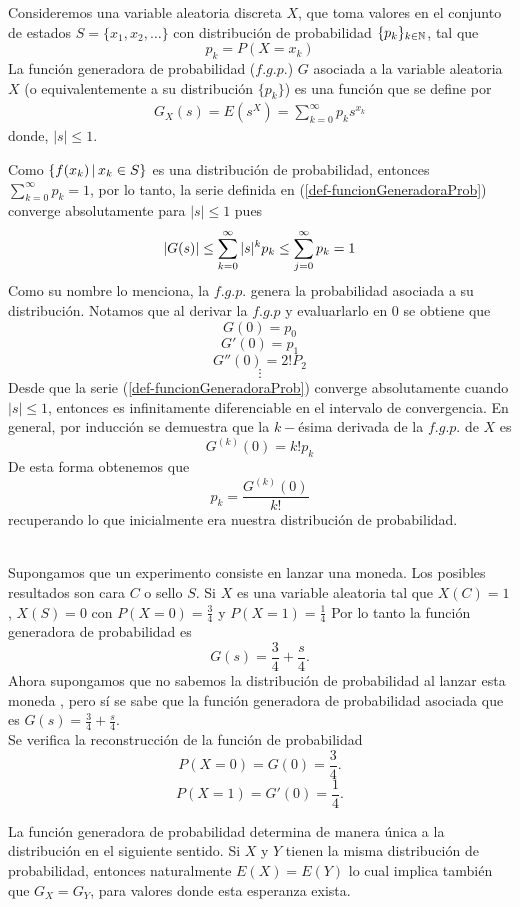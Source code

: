 \begin{Def}
    \label{def-prob-funcionGeneraProb}
    Consideremos una variable aleatoria discreta $X$, que toma valores en el conjunto de estados $S=\{x_1,x_2,\ldots\}$ con distribución de probabilidad $\{p_k\}_{k\in{\mathbb{N}}}$, tal que $$p_k=P(X=x_k)$$ 
    La función generadora de probabilidad ($f.g.p.$) $G$ asociada a la variable aleatoria $X$ (o equivalentemente a su distribución $\{p_k\}$) es una función que se define por 
    \begin{eqnarray}
        G_X(s)=E(s^X)=\sum_{k=0}^\infty p_k s^{x_k} \label{def-funcionGeneradoraProb}
    \end{eqnarray} 
    donde,  $|s|\leq 1$.
\end{Def}
Como $\{f(x_k)\thinspace|\thinspace x_k\in S\}$ es una distribución de probabilidad, entonces\\ $\sum_{k=0}^\infty p_k=1$, por lo tanto, la serie definida en (\ref{def-funcionGeneradoraProb}) converge absolutamente para $|s|\leq 1$ pues $$|G(s)|\leq \sum_{k=0}^\infty|s|^k p_k\leq\sum_{j=0}^{\infty} p_k=1 $$ 
Como su nombre lo menciona, la $f.g.p.$ genera la probabilidad asociada a su distribución.
Notamos que al derivar la $f.g.p$ y evaluarlarlo en $0$ se obtiene que
$$G(0)=p_0$$ $$G'(0)=p_1$$ $$G''(0)=2!P_2$$ $$\vdots$$Desde que la serie (\ref{def-funcionGeneradoraProb}) converge absolutamente cuando $|s|\leq 1$, entonces es infinitamente diferenciable en el intervalo de convergencia. En general, por inducción se demuestra que la $k-$ésima derivada de la $f.g.p.$ de $X$ es $$G^{(k)}(0)=k!p_k$$
De esta forma obtenemos que $$p_k=\frac{G^{(k)}(0)}{k!}$$ recuperando lo que inicialmente era nuestra distribución de probabilidad.\\\\
\begin{Ejm}
    Supongamos que un experimento consiste en lanzar una moneda. Los posibles resultados son cara $C$ o sello $S$. Si $X$ es una variable aleatoria tal que $X(C)=1$, $X(S)=0$ con $P(X=0)=\frac{3}{4}$ y $P(X=1)=\frac{1}{4}$
    Por lo tanto la función generadora de probabilidad es
    $$G(s)=\frac{3}{4}+\frac{s}{4}.$$
    Ahora supongamos que no sabemos la distribución de probabilidad al lanzar esta moneda , pero sí se sabe que la función generadora de probabilidad asociada que es $G(s)=\frac{3}{4}+\frac{s}{4}.$\\
    Se verifica la reconstrucción de la función de probabilidad
    $$P(X=0)=G(0)=\frac{3}{4}.$$    $$P(X=1)=G'(0)=\frac{1}{4}.$$
\end{Ejm}
La función generadora de probabilidad determina de manera única a la distribución en el siguiente sentido. Si $X$ y $Y$ tienen la misma distribución de probabilidad, entonces naturalmente $E(X)=E(Y)$ lo cual implica también que $G_X=G_Y$, para valores donde esta esperanza exista.\\
